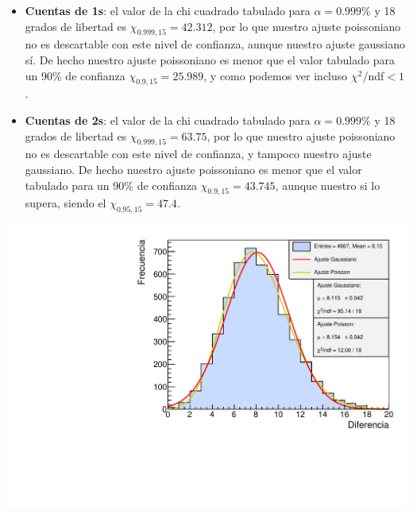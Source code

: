 \documentclass[11pt]{article}
\begin{document}
\begin{itemize}
	\item \textbf{Cuentas de 1s}: el valor de la chi cuadrado tabulado para $\alpha=0.999\%$ y 18 grados de libertad es  $\chi_{0.999,15}=42.312$, por lo que nuestro ajuste poissoniano no es descartable con este nivel de confianza, aunque nuestro ajuste gaussiano sí. De hecho nuestro ajuste poissoniano es menor que el valor tabulado para un 90\% de confianza $\chi_{0.9,15}=25.989$, y como podemos ver incluso $\chi^2/$ndf$<1$. 
	\item \textbf{Cuentas de 2s}: el valor de la chi cuadrado tabulado para $\alpha=0.999\%$ y 18 grados de libertad es  $\chi_{0.999,15}=63.75$, por lo que nuestro ajuste poissoniano no es descartable con este nivel de confianza, y tampoco nuestro ajuste gaussiano. De hecho nuestro ajuste poissoniano es menor que el valor tabulado para un 90\% de confianza $\chi_{0.9,15}=43.745$, aunque nuestro si lo supera, siendo el $\chi_{0.95,15}=47.4$.
\end{itemize}
\begin{minipage}[t]{0.5\linewidth}
	\begin{center}
	 \label{Fig:1s}
	\includegraphics[width=1\linewidth]{../Graficas/Histo_1s.pdf}
	\end{center}
\end{minipage}	
\hfill
\end{document}
